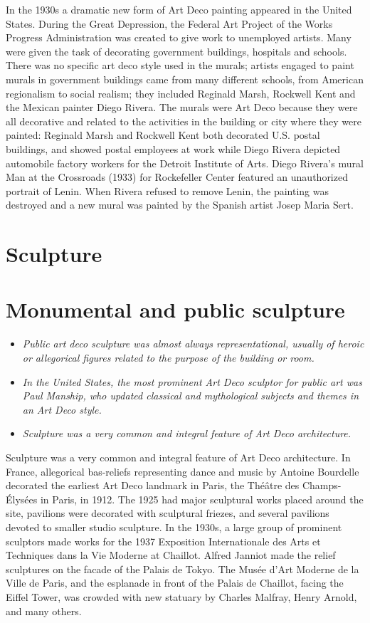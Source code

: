 In the 1930s a dramatic new form of Art Deco painting appeared in the
United States. During the Great Depression, the Federal Art Project of
the Works Progress Administration was created to give work to unemployed
artists. Many were given the task of decorating government buildings,
hospitals and schools. There was no specific art deco style used in the
murals; artists engaged to paint murals in government buildings came
from many different schools, from American regionalism to social
realism; they included Reginald Marsh, Rockwell Kent and the Mexican
painter Diego Rivera. The murals were Art Deco because they were all
decorative and related to the activities in the building or city where
they were painted: Reginald Marsh and Rockwell Kent both decorated U.S.
postal buildings, and showed postal employees at work while Diego Rivera
depicted automobile factory workers for the Detroit Institute of Arts.
Diego Rivera's mural Man at the Crossroads (1933) for Rockefeller Center
featured an unauthorized portrait of Lenin. When Rivera refused to
remove Lenin, the painting was destroyed and a new mural was painted by
the Spanish artist Josep Maria Sert.

\section{Sculpture}\label{sculpture}

\section{Monumental and public
sculpture}\label{monumental-and-public-sculpture}

\begin{itemize}
\item
  \emph{Public art deco sculpture was almost always representational,
  usually of heroic or allegorical figures related to the purpose of the
  building or room.}
\item
  \emph{In the United States, the most prominent Art Deco sculptor for
  public art was Paul Manship, who updated classical and mythological
  subjects and themes in an Art Deco style.}
\item
  \emph{Sculpture was a very common and integral feature of Art Deco
  architecture.}
\end{itemize}

Sculpture was a very common and integral feature of Art Deco
architecture. In France, allegorical bas-reliefs representing dance and
music by Antoine Bourdelle decorated the earliest Art Deco landmark in
Paris, the Théâtre des Champs-Élysées in Paris, in 1912. The 1925 had
major sculptural works placed around the site, pavilions were decorated
with sculptural friezes, and several pavilions devoted to smaller studio
sculpture. In the 1930s, a large group of prominent sculptors made works
for the 1937 Exposition Internationale des Arts et Techniques dans la
Vie Moderne at Chaillot. Alfred Janniot made the relief sculptures on
the facade of the Palais de Tokyo. The Musée d'Art Moderne de la Ville
de Paris, and the esplanade in front of the Palais de Chaillot, facing
the Eiffel Tower, was crowded with new statuary by Charles Malfray,
Henry Arnold, and many others.

